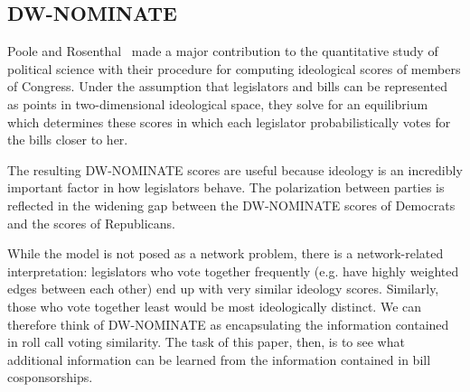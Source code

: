 \subsection{DW-NOMINATE}

Poole and Rosenthal~\cite{Poole} made a major contribution to the quantitative
study of political science with their procedure for computing ideological scores
of members of Congress. Under the assumption that legislators and bills can be
represented as points in two-dimensional ideological space, they solve for an
equilibrium which determines these scores in which each legislator
probabilistically votes for the bills closer to her.

The resulting DW-NOMINATE scores are useful because ideology is an incredibly
important factor in how legislators behave. The polarization between parties is
reflected in the widening gap between the DW-NOMINATE scores of Democrats and
the scores of Republicans.

While the model is not posed as a network problem, there is a network-related
interpretation: legislators who vote together frequently (e.g. have highly
weighted edges between each other) end up with very similar ideology scores.
Similarly, those who vote together least would be most ideologically distinct.
We can therefore think of DW-NOMINATE as encapsulating the information contained
in roll call voting similarity. The task of this paper, then, is to see what
additional information can be learned from the information contained in bill
cosponsorships.
